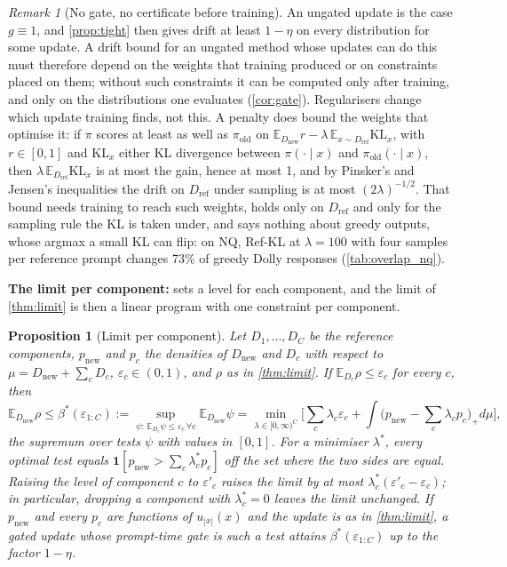\documentclass{article}
\theoremstyle{plain}
\newtheorem{proposition}[theorem]{Proposition}
\theoremstyle{definition}
\theoremstyle{remark}
\newtheorem{remark}[theorem]{Remark}
\newcommand{\E}{\mathbb{E}}
\newcommand{\KL}{\mathrm{KL}}
\newcommand{\Dref}{D_{\mathrm{ref}}}
\newcommand{\Dnew}{D_{\mathrm{new}}}
\newcommand{\pold}{\pi_{\mathrm{old}}}
\newcommand{\ind}{\mathbf{1}}
\begin{document}
\begin{remark}[No gate, no certificate before training]
\label{rem:nogate}
An ungated update is the case $g\equiv1$, and \cref{prop:tight} then gives drift at least $1-\eta$ on every
distribution for some update. A drift bound for an ungated method whose updates can do this must therefore depend on the weights that
training produced or on constraints placed on them; without such constraints it can be computed only after training,
and only on the distributions one evaluates (\cref{cor:gate}).
Regularisers change which update training finds, not this. A penalty does bound the weights that optimise it: if
$\pi$ scores at least as well as $\pold$ on $\E_{\Dnew}r-\lambda\,\E_{x\sim\Dref}\KL_x$, with $r\in[0,1]$ and $\KL_x$
either KL divergence between $\pi(\cdot\mid x)$ and $\pold(\cdot\mid x)$, then $\lambda\,\E_{\Dref}\KL_x$ is at most
the gain, hence at most 1, and by Pinsker's and Jensen's inequalities the drift on $\Dref$ under sampling is at most
$(2\lambda)^{-1/2}$. That bound needs training to reach such weights, holds only on $\Dref$ and only for the sampling
rule the KL is taken under, and says nothing about greedy outputs, whose argmax a small KL can flip: on NQ, Ref-KL at
$\lambda=100$ with four samples per reference prompt changes 73\% of greedy Dolly responses (\cref{tab:overlap_nq}).
\end{remark}

\textbf{The limit per component:}  sets a level for each component, and the limit of
\cref{thm:limit} is then a linear program with one constraint per component.

\begin{proposition}[Limit per component]
\label{prop:percomp}
Let $D_1,\dots,D_C$ be the reference components, $p_{\mathrm{new}}$ and $p_c$ the densities of $\Dnew$ and $D_c$ with
respect to $\mu=\Dnew+\sum_cD_c$, $\varepsilon_c\in(0,1)$, and $\rho$ as in \cref{thm:limit}. If
$\E_{D_c}\rho\le\varepsilon_c$ for every $c$, then
\begin{equation*}
\E_{\Dnew}\rho\le\beta^\ast(\varepsilon_{1:C}):=\sup_{\psi:\,\E_{D_c}\psi\le\varepsilon_c\,\forall c}\E_{\Dnew}\psi
=\min_{\lambda\in[0,\infty)^C}\Big[\sum_c\lambda_c\varepsilon_c+\int\Big(p_{\mathrm{new}}-\sum_c\lambda_cp_c\Big)_+d\mu\Big],
\end{equation*}
the supremum over tests $\psi$ with values in $[0,1]$. For a minimiser $\lambda^\ast$, every optimal test equals
$\ind[p_{\mathrm{new}}>\sum_c\lambda^\ast_cp_c]$ off the set where the two sides are equal. Raising the level of
component $c$ to $\varepsilon'_c$ raises the limit by at most $\lambda^\ast_c(\varepsilon'_c-\varepsilon_c)$; in
particular, dropping a component with $\lambda^\ast_c=0$ leaves the limit unchanged. If $p_{\mathrm{new}}$ and every
$p_c$ are functions of $u_{|x|}(x)$ and the update is as in \cref{thm:limit}, a gated update whose prompt-time gate is
such a test attains $\beta^\ast(\varepsilon_{1:C})$ up to the factor $1-\eta$.
\end{proposition}
\end{document}
